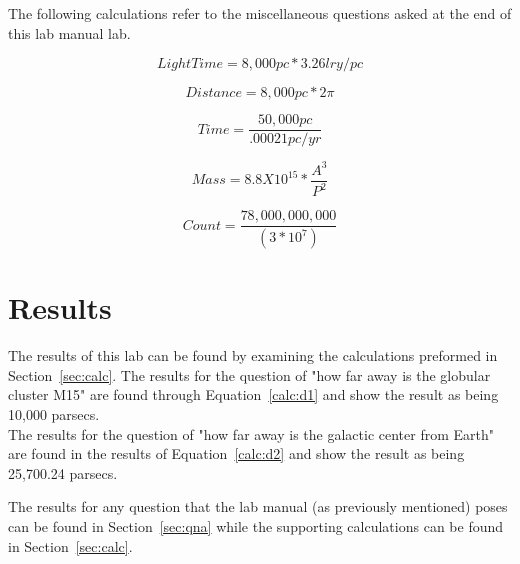 \documentclass{article}
\begin{document}
The following calculations refer to the miscellaneous questions asked at the end
of this lab manual lab.

\begin{equation}
\label{calc:m1}
Light Time = 8,000 pc * 3.26 lry/pc
\end{equation}

\begin{equation}
\label{calc:m2}
Distance = 8,000pc * 2\pi
\end{equation}

\begin{equation}
\label{calc:m3}
Time = \frac{50,000pc}{.00021pc/yr}
\end{equation}

\begin{equation}
\label{calc:m4}
Mass = 8.8X10^{15}*\frac{A^3}{P^2}
\end{equation}

\begin{equation}
\label{calc:m5}
Count = \frac{78,000,000,000}{(3*10^7)}
\end{equation}


\section{Results}

The results of this lab can be found by examining the calculations preformed in 
Section~\ref{sec:calc}. The results for the question of "how far away is the globular
cluster M15" are found through Equation~\ref{calc:d1} and show the result as being
10,000 parsecs.\\

The results for the question of "how far away is the galactic center from Earth"
are found in the results of Equation~\ref{calc:d2} and show the result as being
25,700.24 parsecs.

The results for any question that the lab manual (as previously mentioned) poses
can be found in Section~\ref{sec:qna} while the supporting calculations can be 
found in Section~\ref{sec:calc}.

\end{document}
